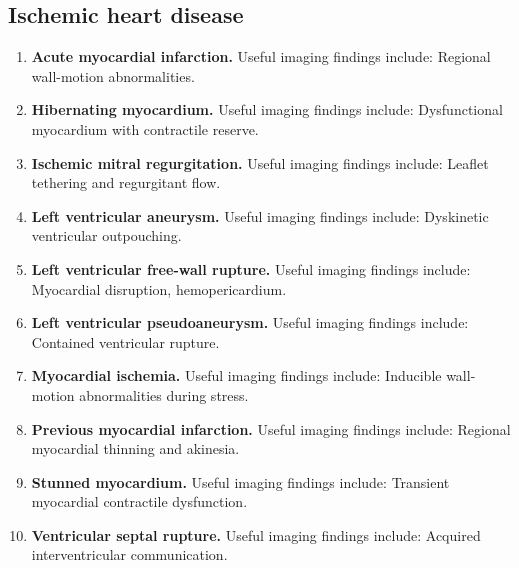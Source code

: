 \subsection{Ischemic heart disease}
\begin{enumerate}[leftmargin=*,itemsep=0.45em,topsep=0.4em]
\item \textbf{Acute myocardial infarction.} Useful imaging findings include: Regional wall-motion abnormalities.
\item \textbf{Hibernating myocardium.} Useful imaging findings include: Dysfunctional myocardium with contractile reserve.
\item \textbf{Ischemic mitral regurgitation.} Useful imaging findings include: Leaflet tethering and regurgitant flow.
\item \textbf{Left ventricular aneurysm.} Useful imaging findings include: Dyskinetic ventricular outpouching.
\item \textbf{Left ventricular free-wall rupture.} Useful imaging findings include: Myocardial disruption, hemopericardium.
\item \textbf{Left ventricular pseudoaneurysm.} Useful imaging findings include: Contained ventricular rupture.
\item \textbf{Myocardial ischemia.} Useful imaging findings include: Inducible wall-motion abnormalities during stress.
\item \textbf{Previous myocardial infarction.} Useful imaging findings include: Regional myocardial thinning and akinesia.
\item \textbf{Stunned myocardium.} Useful imaging findings include: Transient myocardial contractile dysfunction.
\item \textbf{Ventricular septal rupture.} Useful imaging findings include: Acquired interventricular communication.
\end{enumerate}

